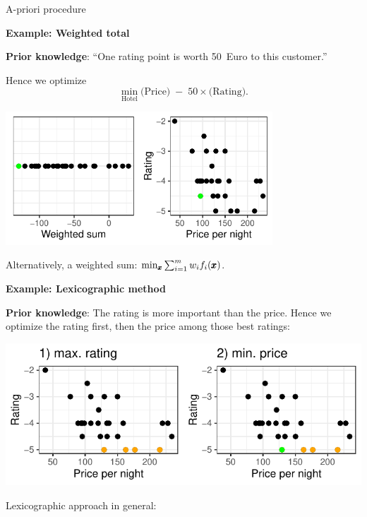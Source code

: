 \documentclass[11pt,compress,t,notes=noshow,xcolor=table]{beamer}
\begin{document}
\begin{vbframe}{A-priori procedure}

\textbf{Example: Weighted total}

\textbf{Prior knowledge}: 
``One rating point is worth 50~Euro to this customer.'' 

Hence we optimize
\[
\min_{\text{Hotel}} \text{(Price)} \;-\; 50 \times \text{(Rating)}.
\]

\begin{center}
\includegraphics[width=0.75\textwidth]{slides/11-multicrit/figure_man/expedia-9-1.pdf}
\end{center}

Alternatively, a weighted sum: 
\(\min_{\pmb{x}} \sum_{i=1}^m w_i f_i(\pmb{x})\).

\framebreak

\textbf{Example: Lexicographic method}

\textbf{Prior knowledge}: The rating is more important than the price. 
Hence we optimize the rating first, then the price among those best ratings:

\begin{center}
\includegraphics[width=1\textwidth]{slides/11-multicrit/figure_man/expedia-10-1.pdf}
\end{center}

\framebreak

Lexicographic approach in general:


\end{vbframe}
\end{document}
